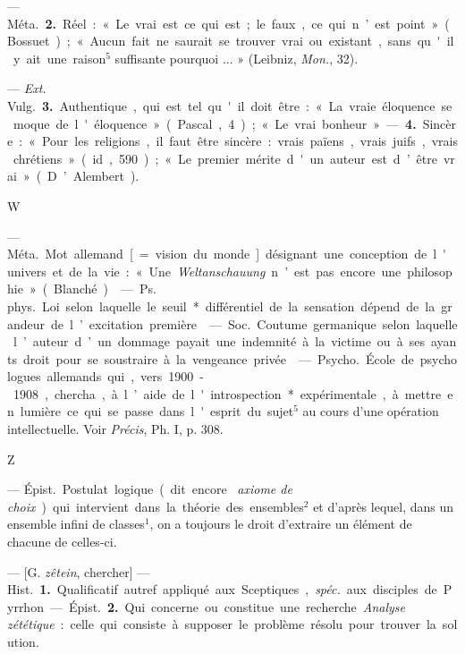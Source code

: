 \begin{itemize}[leftmargin=1cm, label=, itemsep=1pt]
— \si{Méta.}  {\bf 2.} Réel : « Le vrai est ce qui est ; le faux, ce qui
n’est point » (Bossuet) ; « Aucun fait ne saurait se trouver vrai ou
existant, sans qu'il y ait une raison$^5$ suffisante pourquoi ... » (Leibniz,
{\it Mon.}, 32).

— {\it Ext.} \si{Vulg.} {\bf 3.} Authentique, qui est tel qu'il doit être : « La
vraie éloquence se moque de l'éloquence » (Pascal, 4) ; « Le vrai bonheur ». —
{\bf 4.} Sincère : « Pour les religions, il faut être sincère : vrais
païens, vrais juifs, vrais chrétiens » (id, 590) ; « Le premier mérite d'un
auteur est d’être vrai » (D’Alembert).

\begin{center}
\huge{W}
\end{center}

 — \si{Méta.} Mot allemand [= vision du monde] désignant
une conception de l'univers et de la vie : « Une {\it Weltanschauung} n’est
pas encore une philosophie » (Blanché).

 — \si{Ps. phys.} Loi selon laquelle le seuil*
différentiel de la sensation dépend de la grandeur de l’excitation première.

 — \si{Soc.} Coutume germanique selon laquelle l’auteur d’un
dommage payait une indemnité à la victime ou à ses ayants droit pour se
soustraire à la vengeance privée.

 — \si{Psycho.} École de psychologues allemands qui,
vers 1900-1908, chercha, à l’aide de l'introspection* expérimentale, à mettre
en lumière ce qui se passe dans l'esprit du sujet$^5$ au cours d’une
opération intellectuelle. Voir {\it Précis}, Ph. I, p. 308.

\begin{center}
\huge{Z}
\end{center}

 — \si{Épist.} Postulat logique (dit encore {\it
axiome de choix}) qui intervient dans la théorie des ensembles$^2$ et d’après
lequel, dans un ensemble infini de classes$^1$, on a toujours le droit
d'extraire un élément de chacune de celles-ci.

 — [G. {\it zêtein}, chercher] — \si{Hist.} {\bf 1.} Qualificatif
autref. appliqué aux Sceptiques, {\it spéc.} aux disciples de Pyrrhon. —
\si{Épist.} {\bf 2.} Qui concerne ou constitue une recherche. {\it Analyse
zététique} : celle qui consiste à supposer le problème résolu pour trouver la
solution.

	\end{itemize}
